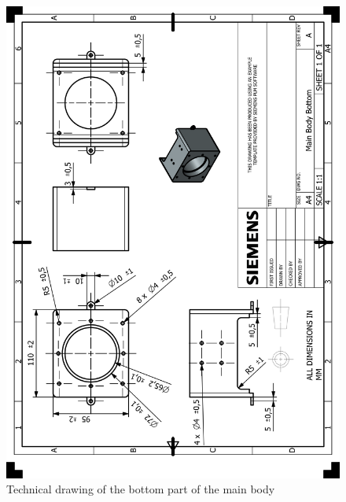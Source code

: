 \documentclass[12pt]{report}
\begin{document}
\begin{appendices}
\begin{figure}[H]
    \centering
    \includegraphics[width=\textwidth]{HP_Main Body Bottom.png} 
    \caption{Technical drawing of the bottom part of the main body}
    \label{fig:technical-drawing}
\end{figure}


\end{appendices}
\end{document}
